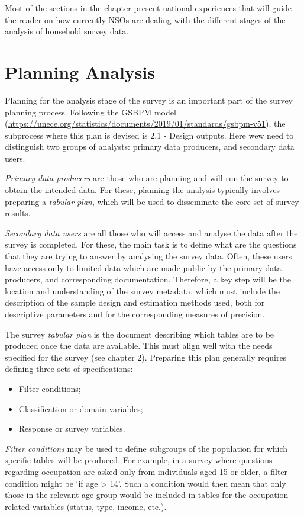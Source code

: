 \documentclass[
  12pt,
]{book}
\begin{document}
Most of the sections in the chapter present national experiences that will guide the reader on how currently NSOs are dealing with the different stages of the analysis of household survey data.

\hypertarget{planning-analysis}{%
\section{Planning Analysis}\label{planning-analysis}}

Planning for the analysis stage of the survey is an important part of the survey planning process. Following the GSBPM model (\url{https://unece.org/statistics/documents/2019/01/standards/gsbpm-v51}), the subprocess where this plan is devised is 2.1 - Design outputs. Here wew need to distinguish two groups of analysts: primary data producers, and secondary data users.

\emph{Primary data producers} are those who are planning and will run the survey to obtain the intended data. For these, planning the analysis typically involves preparing a \emph{tabular plan}, which will be used to disseminate the core set of survey results.

\emph{Secondary data users} are all those who will access and analyse the data after the survey is completed. For these, the main task is to define what are the questions that they are trying to answer by analysing the survey data. Often, these users have access only to limited data which are made public by the primary data producers, and corresponding documentation. Therefore, a key step will be the location and understanding of the survey metadata, which must include the description of the sample design and estimation methods used, both for descriptive parameters and for the corresponding measures of precision.

The survey \emph{tabular plan} is the document describing which tables are to be produced once the data are available. This must align well with the needs specified for the survey (see chapter 2). Preparing this plan generally requires defining three sets of specifications:

\begin{itemize}
\item
  Filter conditions;
\item
  Classification or domain variables;
\item
  Response or survey variables.
\end{itemize}

\emph{Filter conditions} may be used to define subgroups of the population for which specific tables will be produced. For example, in a survey where questions regarding occupation are asked only from individuals aged 15 or older, a filter condition might be `if age \textgreater{} 14'. Such a condition would then mean that only those in the relevant age group would be included in tables for the occupation related variables (status, type, income, etc.).
\end{document}
